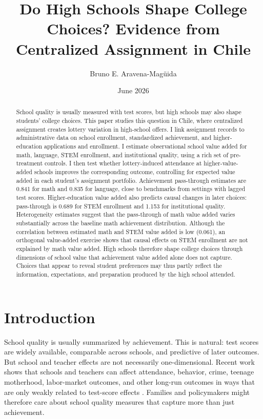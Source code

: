\documentclass[a4paper, article, english, oneside, unknownkeysallowed, 12pt]{memoir}
\title{Do High Schools Shape College Choices? Evidence from Centralized Assignment in Chile}
\author{ Bruno E. Aravena-Magüida}
\date{June 2026}
\begin{document}
\maketitle

\begin{abstract}
School quality is usually measured with test scores, but high schools may also shape students' college choices.
This paper studies this question in Chile, where centralized assignment creates lottery variation in high-school offers.
I link assignment records to administrative data on school enrollment, standardized achievement, and higher-education applications and enrollment.
I estimate observational school value added for math, language, STEM enrollment, and institutional quality, using a rich set of pre-treatment controls.
I then test whether lottery-induced attendance at higher-value-added schools improves the corresponding outcome, controlling for expected value added in each student's assignment portfolio.
Achievement pass-through estimates are 0.841 for math and 0.835 for language, close to benchmarks from settings with lagged test scores.
Higher-education value added also predicts causal changes in later choices: pass-through is 0.689 for STEM enrollment and 1.153 for institutional quality.
Heterogeneity estimates suggest that the pass-through of math value added varies substantially across the baseline math achievement distribution.
Although the correlation between estimated math and STEM value added is low (0.061), an orthogonal value-added exercise shows that causal effects on STEM enrollment are not explained by math value added.
High schools therefore shape college choices through dimensions of school value that achievement value added alone does not capture.
Choices that appear to reveal student preferences may thus partly reflect the information, expectations, and preparation produced by the high school attended.
\end{abstract}

\setcounter{tocdepth}{2}
\renewcommand\contentsname{}

\clearpage
\section{Introduction}

School quality is usually summarized by achievement.
This is natural: test scores are widely available, comparable across schools, and predictive of later outcomes.
But school and teacher effects are not necessarily one-dimensional.
Recent work shows that schools and teachers can affect attendance, behavior, crime, teenage motherhood, labor-market outcomes, and other long-run outcomes in ways that are only weakly related to test-score effects \parencite{jackson_what_2018, beuermann_what_2023, rose_effects_2022, angrist_methods_2023}.
Families and policymakers might therefore care about school quality measures that capture more than just achievement.
\end{document}
